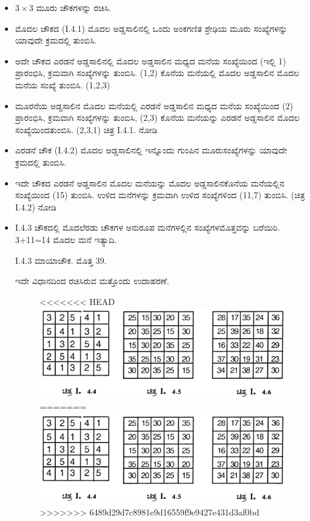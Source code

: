 \begin{itemize}
	\item $3 \times 3$ ಮೂರು ಚೌಕಗಳನ್ನು ರಚಿಸಿ.
	\item ಮೊದಲ ಚೌಕದ (I.4.1) ಮೊದಲ ಅಡ್ಡಸಾಲಿನಲ್ಲಿ ಒಂದು ಅಂಕಗಣಿತ ಶ್ರೇಢಿಯ ಮೂರು ಸಂಖ್ಯೆಗಳನ್ನು ಯಾವುದೇ ಕ್ರಮದಲ್ಲಿ ತುಂಬಿಸಿ.
	\item ಅದೇ ಚೌಕದ ಎರಡನೆ ಅಡ್ಡಸಾಲಿನಲ್ಲಿ ಮೊದಲ ಅಡ್ಡಸಾಲಿನ ಮಧ್ಯದ ಮನೆಯ ಸಂಖ್ಯೆ\-ಯಿಂದ (ಇಲ್ಲಿ 1) ಪ್ರಾರಂಭಿಸಿ, ಕ್ರಮವಾಗಿ ಸಂಖ್ಯೆಗಳನ್ನು ತುಂಬಿಸಿ. (1,2) ಕೊನೆಯ ಮನೆಯಲ್ಲಿ ಮೊದಲ ಅಡ್ಡಸಾಲಿನ ಮೊದಲ ಮನೆಯ ಸಂಖ್ಯೆ ತುಂಬಿಸಿ. (1,2,3)
	\item ಮೂರನೆಯ ಅಡ್ಡಸಾಲಿನ ಮೊದಲ ಮನೆಯಲ್ಲಿ ಎರಡನೆ ಅಡ್ಡಸಾಲಿನ ಮಧ್ಯದ ಮನೆಯ ಸಂಖ್ಯೆಯಿಂದ (2) ಪ್ರಾರಂಭಿಸಿ, ಕ್ರಮವಾಗಿ ಸಂಖ್ಯೆಗಳನ್ನು ತುಂಬಿಸಿ, (2,3) ಕೊನೆಯ ಮನೆಯನ್ನು ಎರಡನೆ ಅಡ್ಡಸಾಲಿನ ಮೊದಲ ಸಂಖ್ಯೆಯಿಂದ\break ತುಂಬಿಸಿ. (2,3,1) ಚಿತ್ರ I.4.1. ನೋಡಿ
	\item ಎರಡನೆ ಚೌಕ (I.4.2) ಮೊದಲ ಅಡ್ಡಸಾಲಿನಲ್ಲಿ ಇನ್ನೊಂದು ಗುಂಪಿನ ಮೂರು\break ಸಂಖ್ಯೆಗಳನ್ನು ಯಾವುದೇ ಕ್ರಮದಲ್ಲಿ ತುಂಬಿಸಿ.
	\item ಇದೇ ಚೌಕದ ಎರಡನೆ ಅಡ್ಡಸಾಲಿನ ಮೊದಲ ಮನೆಯನ್ನು ಮೊದಲ ಅಡ್ಡಸಾಲಿನ\break ಕೊನೆಯ ಮನೆಯಲ್ಲಿನ ಸಂಖ್ಯೆಯಿಂದ (15) ತುಂಬಿಸಿ. ಉಳಿದ ಮನೆಗಳನ್ನು ಕ್ರಮ\-ವಾಗಿ ಉಳಿದ ಸಂಖ್ಯೆಗಳಿಂದ (11,7) ತುಂಬಿಸಿ. (ಚಿತ್ರ I.4.2) ನೋಡಿ
	\item I.4.3 ಚೌಕದಲ್ಲಿ ಮೊದಲೆರಡು ಚೌಕಗಳ ಅನುರೂಪ ಮನೆಗಳಲ್ಲಿನ ಸಂಖ್ಯೆಗಳ\break ಮೊತ್ತವನ್ನು ಬರೆಯಿರಿ. 3+11=14 ಮೊದಲ ಮನೆ ಇತ್ಯಾದಿ.

	I.4.3 ಮಾಯಾಚೌಕ. ಮೊತ್ತ 39.

	ಇದೇ ವಿಧಾನದಿಂದ ರಚಿಸಿರುವ ಮತ್ತೊಂದು ಉದಾಹರಣೆ.
	\begin{figure}[h]
<<<<<<< HEAD
	\includegraphics{src/figures/chap3/fig3-10.jpg}
=======
	\includegraphics[scale=.95]{src/figures/chap3/fig3.10.jpg}
>>>>>>> 6489d29d7c8981e9d16559f9e9427e431d3af0bd
	\end{figure}


\end{itemize}

